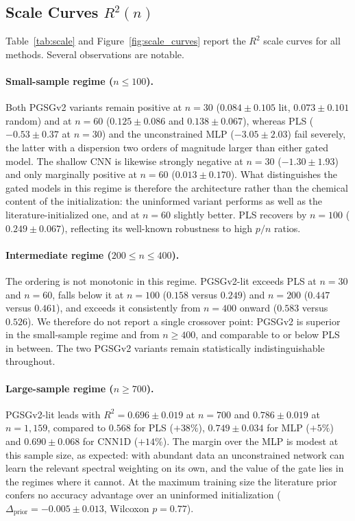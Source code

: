 \documentclass[preprint,12pt,hidelinks]{elsarticle}
\begin{document}
\subsection{Scale Curves $R^2(n)$}
\label{sec:results_scale}

Table~\ref{tab:scale} and Figure~\ref{fig:scale_curves} report the
$R^2$ scale curves for all methods. Several observations are notable.

\paragraph{Small-sample regime ($n \leq 100$).}
Both PGSGv2 variants remain positive at $n = 30$ ($0.084 \pm 0.105$ lit,
$0.073 \pm 0.101$ random) and at $n = 60$ ($0.125 \pm 0.086$ and
$0.138 \pm 0.067$), whereas PLS ($-0.53 \pm 0.37$ at $n = 30$) and the
unconstrained MLP ($-3.05 \pm 2.03$) fail severely, the latter with a
dispersion two orders of magnitude larger than either gated model. The
shallow CNN is likewise strongly negative at $n = 30$ ($-1.30 \pm 1.93$) and
only marginally positive at $n = 60$ ($0.013 \pm 0.170$). What distinguishes
the gated models in this regime is therefore the architecture rather than the
chemical content of the initialization: the uninformed variant performs as
well as the literature-initialized one, and at $n = 60$ slightly better. PLS
recovers by $n = 100$ ($0.249 \pm 0.067$), reflecting its well-known
robustness to high $p/n$ ratios.

\paragraph{Intermediate regime ($200 \leq n \leq 400$).}
The ordering is not monotonic in this regime. PGSGv2-lit exceeds PLS at
$n = 30$ and $n = 60$, falls below it at $n = 100$ ($0.158$ versus $0.249$)
and $n = 200$ ($0.447$ versus $0.461$), and exceeds it consistently from
$n = 400$ onward ($0.583$ versus $0.526$). We therefore do not report a
single crossover point: PGSGv2 is superior in the small-sample regime and
from $n \geq 400$, and comparable to or below PLS in between. The two PGSGv2
variants remain statistically indistinguishable throughout.

\paragraph{Large-sample regime ($n \geq 700$).}
PGSGv2-lit leads with $R^2 = 0.696 \pm 0.019$ at $n = 700$ and
$0.786 \pm 0.019$ at $n = 1{,}159$, compared to $0.568$ for PLS ($+38\%$),
$0.749 \pm 0.034$ for MLP ($+5\%$) and $0.690 \pm 0.068$ for CNN1D
($+14\%$). The margin over the MLP is modest at this sample size, as
expected: with abundant data an unconstrained network can learn the relevant
spectral weighting on its own, and the value of the gate lies in the regimes
where it cannot. At the maximum training size the literature prior confers no
accuracy advantage over an uninformed initialization
($\Delta_\mathrm{prior} = -0.005 \pm 0.013$, Wilcoxon $p = 0.77$).
\end{document}
